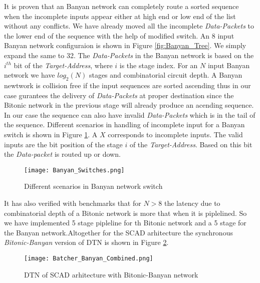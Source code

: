 					      It is proven \cite{batcher_banyan_ref} that 
					      an Banyan network can completely route a sorted sequence when the incomplete inputs appear either at high end or low end of the list without any conflicts. We have already moved all the incomplete \textit{Data-Packets}
					      to the lower end of the sequence with the help of modified switch. An 8 input Banyan network configuraion is shown in Figure \ref{fig:Banyan_Tree}. We simply expand the same to 32.
					      The \textit{Data-Packets} in the Banyan network is based on the $i^{th}$ bit of the \textit{Target-Address}, where $i$ is the stage index. For an $N$ input Banyan network we have $log_{2}(N)$ 
					      stages and combinatorial circuit depth. A Banyan newtwork is collision free if the input sequences are sorted ascending
					      thus in our case gurantees the delivery of \textit{Data-Packets} at proper destination since the Bitonic network in the previous stage will already produce an acending sequence. In our case 
					      the sequence can also have invalid \textit{Data-Packets} which is in the tail of the sequence. Different scenarios in handling of incomplete input for a Banyan switch is shown in Figure \ref{fig:Banyan_Switches}.
					      A $X$ corresponds to incomplete inputs. The valid inputs are the bit position of the stage $i$ of the \textit{Target-Address}. Based on this bit the \textit{Data-packet} is routed up or down.
					      \begin{figure}[!ht]
						      \texttt{[image: Banyan\_Switches.png]}
						      \caption{Different scenarios in Banyan network switch }
					      \label{fig:Banyan_Switches}
					      \end{figure}
					      It has also verified with benchmarks \cite{sorting_network_on_fpgas} that for $N > 8$ the latency due to combinatorial depth of a Bitonic network is more that when it is piplelined. So we have implemented 5 stage pipleline 
					      for th Bitonic network and a 5 stage for the Banyan network.Altogether for the SCAD arhitecture the synchronous \textit{Bitonic-Banyan} version of DTN is shown in Figure \ref{fig:Batcher_Banyan_Combined}.
					      \begin{figure}[!ht]
						      \texttt{[image: Batcher\_Banyan\_Combined.png]}
						      \caption{DTN of SCAD arhitecture with Bitonic-Banyan network}
					      \label{fig:Batcher_Banyan_Combined}
					      \end{figure}
